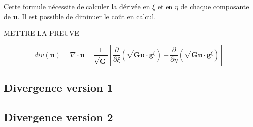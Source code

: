 Cette formule nécessite de calculer la dérivée en $\xi$ et en $\eta$ de chaque composante de $\mathbf{u}$. Il est possible de diminuer le coût en calcul.

METTRE LA PREUVE

\begin{equation}
div( \mathbf{u} ) = \nabla \cdot \mathbf{u} = \dfrac{1}{\sqrt{\overline{\mathbf{G}}}} \left[ \dfrac{\partial}{\partial \xi} \left( \sqrt{\overline{\mathbf{G}}} \mathbf{u} \cdot \mathbf{g}^{\xi} \right) + \dfrac{\partial}{\partial \eta} \left( \sqrt{\overline{\mathbf{G}}} \mathbf{u} \cdot \mathbf{g}^{\xi} \right) \right]
\label{eq:divergence}
\end{equation}

\subsection{Divergence version 1}

\subsection{Divergence version 2}
